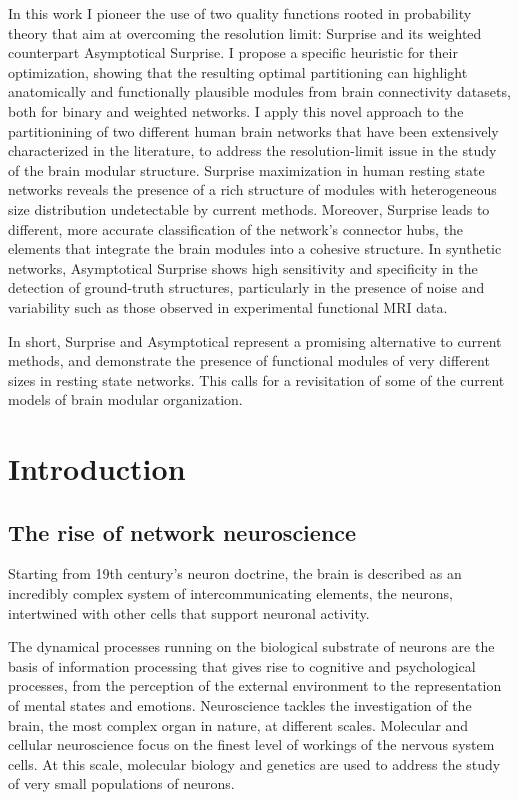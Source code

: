 \documentclass[11pt,              a4paper,              twoside,openright,              titlepage,              headinclude,footinclude,                            numbers=noenddot,              cleardoublepage=empty,]{scrreprt}
\begin{document}
In this work I pioneer the use of two quality functions rooted in probability theory that aim at overcoming the resolution limit: Surprise and its weighted counterpart Asymptotical Surprise.
I propose a specific heuristic for their optimization, showing that the resulting optimal partitioning can highlight anatomically and functionally plausible modules from brain connectivity datasets, both for binary and weighted networks. 
I apply this novel approach to the partitionining of two different human brain networks that have been extensively characterized in the literature, to address the resolution-limit issue in the study of the brain modular structure.
Surprise maximization in human resting state networks reveals the presence of a rich structure of modules with heterogeneous size distribution undetectable by current methods. Moreover, Surprise leads to different, more accurate classification of the network's connector hubs, the elements that integrate the brain modules into a cohesive structure.
In synthetic networks, Asymptotical Surprise shows high sensitivity and specificity in the detection of ground-truth structures, particularly in the presence of noise and variability such as those observed in experimental functional MRI data.

In short, Surprise and Asymptotical represent a promising alternative to current methods, and demonstrate the presence of functional modules of very different sizes in resting state networks.
This calls for a revisitation of some of the current models of brain modular organization.

\chapter{Introduction}\label{chap:introduction}


\section{The rise of network neuroscience}
Starting from 19th century’s neuron doctrine, the brain is described as an incredibly complex system of intercommunicating elements, the neurons, intertwined with other cells that support neuronal activity.

The dynamical processes running on the biological substrate of neurons are the basis of information processing that gives rise to cognitive and psychological processes, from the perception of the external environment to the representation of mental states and emotions.
Neuroscience tackles the investigation of the brain, the most complex organ in nature, at different scales.
Molecular and cellular neuroscience focus on the finest level of workings of the nervous system cells.
At this scale, molecular biology and genetics are used to address the study of very small populations of neurons.
\end{document}
